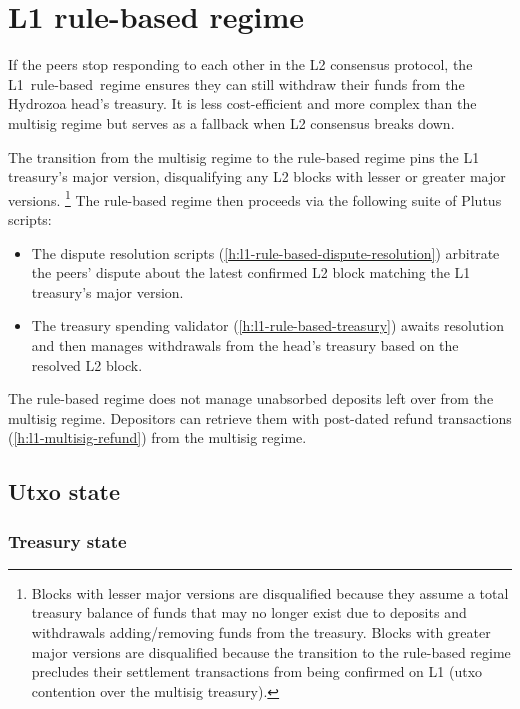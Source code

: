 \documentclass[../hydrozoa.tex]{subfiles}
\begin{document}
\chapter{L1 rule-based regime}%
\label{h:l1-rule-based-regime}%

If the peers stop responding to each other in the L2 consensus protocol, the L1~rule-based~regime ensures they can still withdraw their funds from the Hydrozoa head's treasury.
It is less cost-efficient and more complex than the multisig regime but serves as a fallback when L2 consensus breaks down.

The transition from the multisig regime to the rule-based regime pins the L1 treasury's major version, disqualifying any L2 blocks with lesser or greater major versions.%
\footnote{Blocks with lesser major versions are disqualified because they assume a total treasury balance of funds that may no longer exist due to deposits and withdrawals adding/removing funds from the treasury.
  Blocks with greater major versions are disqualified because the transition to the rule-based regime precludes their settlement transactions from being confirmed on L1 (utxo contention over the multisig treasury).}
The rule-based regime then proceeds via the following suite of Plutus scripts:
\begin{itemize}
  \item The dispute resolution scripts (\cref{h:l1-rule-based-dispute-resolution}) arbitrate the peers' dispute about the latest confirmed L2 block matching the L1 treasury's major version.
  \item The treasury spending validator (\cref{h:l1-rule-based-treasury}) awaits resolution and then manages withdrawals from the head's treasury based on the resolved L2 block.
\end{itemize}

The rule-based regime does not manage unabsorbed deposits left over from the multisig regime.
Depositors can retrieve them with post-dated refund transactions (\cref{h:l1-multisig-refund}) from the multisig regime.

\section{Utxo state}%
\label{h:l1-rule-based-utxo-state}%

\subsection{Treasury state}%
\label{h:l1-rule-based-treasury-state}%
\end{document}
